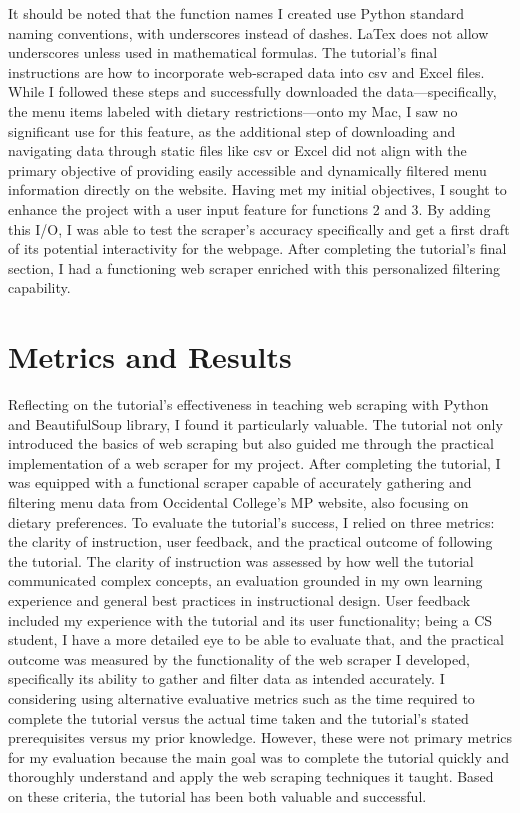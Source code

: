 \documentclass[10pt,twocolumn]{article}
\begin{document}
It should be noted that the function names I created use Python standard naming conventions, with underscores instead of dashes. LaTex does not allow underscores unless used in mathematical formulas.
The tutorial's final instructions are how to incorporate web-scraped data into csv and Excel files. While I followed these steps and successfully downloaded the data—specifically, the menu items labeled with dietary restrictions—onto my Mac, I saw no significant use for this feature, as the additional step of downloading and navigating data through static files like csv or Excel did not align with the primary objective of providing easily accessible and dynamically filtered menu information directly on the website.
Having met my initial objectives, I sought to enhance the project with a user input feature for functions 2 and 3. By adding this I/O, I was able to test the scraper's accuracy specifically and get a first draft of its potential interactivity for the webpage. After completing the tutorial's final section, I had a functioning web scraper enriched with this personalized filtering capability.


\section{Metrics and Results}

Reflecting on the tutorial's effectiveness in teaching web scraping with Python and BeautifulSoup library, I found it particularly valuable. The tutorial not only introduced the basics of web scraping but also guided me through the practical implementation of a web scraper for my project. After completing the tutorial, I was equipped with a functional scraper capable of accurately gathering and filtering menu data from Occidental College's MP website, also focusing on dietary preferences. To evaluate the tutorial's success, I relied on three metrics: the clarity of instruction, user feedback, and the practical outcome of following the tutorial. The clarity of instruction was assessed by how well the tutorial communicated complex concepts, an evaluation grounded in my own learning experience and general best practices in instructional design. User feedback included my experience with the tutorial and its user functionality; being a CS student, I have a more detailed eye to be able to evaluate that, and the practical outcome was measured by the functionality of the web scraper I developed, specifically its ability to gather and filter data as intended accurately. I considering using alternative evaluative metrics such as the time required to complete the tutorial versus the actual time taken and the tutorial's stated prerequisites versus my prior knowledge. However, these were not primary metrics for my evaluation because the main goal was to complete the tutorial quickly and thoroughly understand and apply the web scraping techniques it taught. Based on these criteria, the tutorial has been both valuable and successful. 
\end{document}

